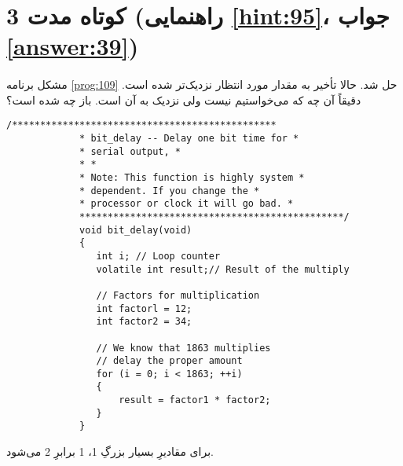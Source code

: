 \section[کوتاه مدت 3]{کوتاه مدت 3 \protect{} (راهنمایی \ref{hint:95}، جواب \ref{answer:39})}
\paragraph{}\label{prog:110}
مشکل برنامه \ref{prog:109} حل شد. حالا تأخیر به مقدار مورد انتظار نزدیک‌تر شده است. دقیقاً آن چه که می‌خواستیم نیست ولی نزدیک به آن است. باز چه شده است؟

\begin{LTR}
        \begin{lstlisting}[style=C++Style]
             /***********************************************
             * bit_delay -- Delay one bit time for *
             * serial output, *
             * *
             * Note: This function is highly system *
             * dependent. If you change the *
             * processor or clock it will go bad. *
             ***********************************************/
             void bit_delay(void)
             {
             	int i; // Loop counter
             	volatile int result;// Result of the multiply

             	// Factors for multiplication
             	int factorl = 12;
             	int factor2 = 34;

             	// We know that 1863 multiplies
             	// delay the proper amount
             	for (i = 0; i < 1863; ++i)
             	{
             		result = factor1 * factor2;
             	}
             }
        \end{lstlisting}
\end{LTR}

\begin{tcolorbox}
    برای مقادیرِ بسیار بزرگِ 1، 1 برابرِ 2 می‌شود.
\end{tcolorbox}